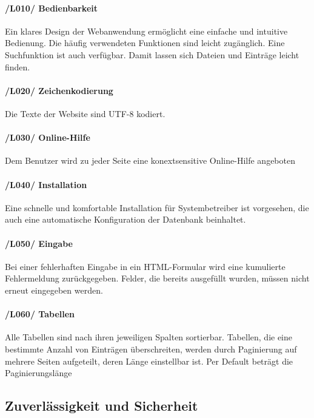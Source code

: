 \documentclass{article}
\begin{document}
     \paragraph{/L010/ \label{L010} Bedienbarkeit}
    Ein klares Design der Webanwendung ermöglicht eine einfache und intuitive Bedienung. Die häufig verwendeten Funktionen sind leicht zugänglich. Eine Suchfunktion ist auch  verfügbar. Damit lassen sich Dateien und Einträge leicht finden.
    
     \paragraph{/L020/ \label{L020} Zeichenkodierung} Die Texte  der Website sind UTF-8 kodiert.
     
      \paragraph{/L030/  \label{L030} Online-Hilfe} Dem Benutzer wird zu jeder Seite eine konextsensitive Online-Hilfe angeboten
      
      \paragraph{/L040/ \label{040} Installation}
      Eine schnelle und komfortable Installation für Systembetreiber ist vorgesehen, die auch eine automatische Konfiguration der Datenbank beinhaltet.
      
      \paragraph{/L050/ \label{L050} Eingabe}
      Bei einer fehlerhaften Eingabe in ein HTML-Formular wird eine kumulierte Fehlermeldung zurückgegeben. Felder, die bereits ausgefüllt wurden, müssen nicht erneut eingegeben werden.
      
      \paragraph{/L060/ \label{L060} Tabellen}
      
    Alle Tabellen sind nach ihren jeweiligen Spalten sortierbar. Tabellen,
    die eine bestimmte Anzahl von Einträgen überschreiten, werden durch Paginierung auf mehrere Seiten aufgeteilt, deren Länge einstellbar ist. Per Default beträgt die Paginierungslänge 
      
      
\subsection{Zuverlässigkeit und Sicherheit}
\end{document}
